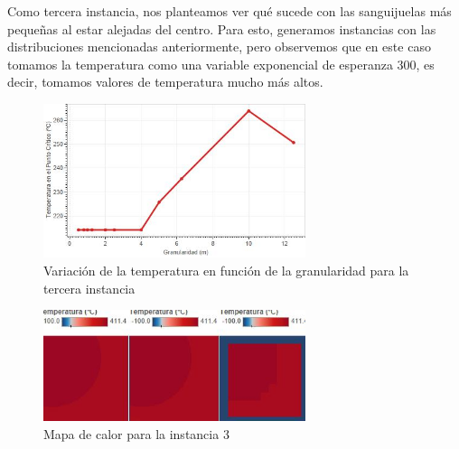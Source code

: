 Como tercera instancia, nos planteamos ver qué sucede con las sanguijuelas más pequeñas al estar alejadas del centro. Para esto, generamos instancias con las distribuciones mencionadas anteriormente, pero observemos que en este caso tomamos la temperatura como una variable exponencial de esperanza $300$, es decir, tomamos valores de temperatura mucho más altos. 

\begin{figure}[h]
    \centering
    \includegraphics[width=0.685\textwidth]{experimento 1-3}
    \caption{Variación de la temperatura en función de la granularidad para la tercera instancia}
    \label{fig:exp13}
\end{figure}



\begin{figure}[h]
    \centering
    \includegraphics[width=0.685\textwidth]{Ejemplo Instancia 2}
    \caption{Mapa de calor para la instancia 3}
    \label{fig:exp13-vis}
\end{figure}